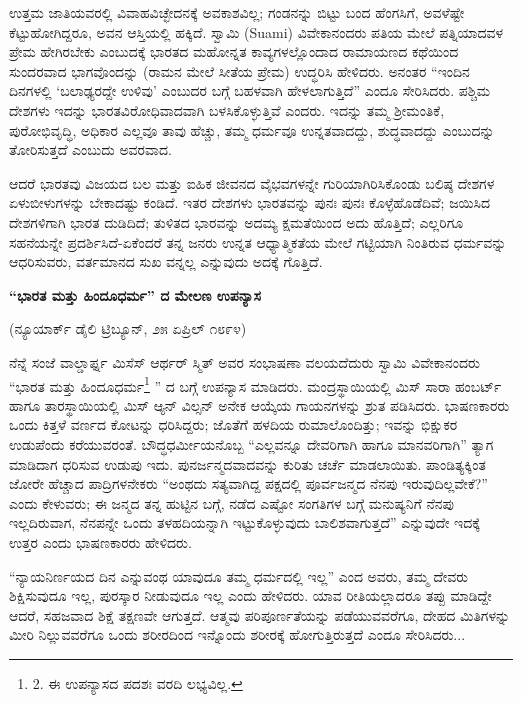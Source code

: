 ಉತ್ತಮ ಜಾತಿಯವರಲ್ಲಿ ವಿವಾಹವಿಚ್ಛೇದನಕ್ಕೆ ಅವಕಾಶವಿಲ್ಲ; ಗಂಡನನ್ನು ಬಿಟ್ಟು ಬಂದ ಹೆಂಗಸಿಗೆ, ಅವಳೆಷ್ಟೇ ಕೆಟ್ಟುಹೋಗಿದ್ದರೂ, ಅವನ ಆಸ್ತಿಯಲ್ಲಿ ಹಕ್ಕಿದೆ. ಸ್ವಾಮಿ (Suami) ವಿವೇಕಾನಂದರು ಪತಿಯ ಮೇಲೆ ಪತ್ನಿಯಾದವಳ ಪ್ರೇಮ ಹೇಗಿರಬೇಕು ಎಂಬುದಕ್ಕೆ ಭಾರತದ ಮಹೋನ್ನತ ಕಾವ್ಯಗಳಲ್ಲೊಂದಾದ ರಾಮಾಯಣದ ಕಥೆಯಿಂದ ಸುಂದರವಾದ ಭಾಗವೊಂದನ್ನು (ರಾಮನ ಮೇಲೆ ಸೀತೆಯ ಪ್ರೇಮ) ಉದ್ಧರಿಸಿ ಹೇಳಿದರು. ಅನಂತರ “ಇಂದಿನ ದಿನಗಳಲ್ಲಿ ‘ಬಲಾಢ್ಯರದ್ದೇ ಉಳಿವು’ ಎಂಬುದರ ಬಗ್ಗೆ ಬಹಳವಾಗಿ ಹೇಳಲಾಗುತ್ತಿದೆ” ಎಂದೂ ಸೇರಿಸಿದರು. ಪಶ್ಚಿಮ ದೇಶಗಳು ಇದನ್ನು ಭಾರತವಿರೋಧಿವಾದವಾಗಿ ಬಳಸಿಕೊಳ್ಳುತ್ತಿವೆ ಎಂದರು. ಇದನ್ನು ತಮ್ಮ ಶ‍್ರೀಮಂತಿಕೆ, ಪುರೋಭಿವೃದ್ಧಿ, ಅಧಿಕಾರ ಎಲ್ಲವೂ ತಾವು ಹೆಚ್ಚು, ತಮ್ಮ ಧರ್ಮವೂ ಉನ್ನತವಾದದ್ದು, ಶುದ್ಧವಾದದ್ದು ಎಂಬುದನ್ನು ತೋರಿಸುತ್ತದೆ ಎಂಬುದು ಅವರವಾದ.

ಆದರೆ ಭಾರತವು ವಿಜಯದ ಬಲ ಮತ್ತು ಐಹಿಕ ಜೀವನದ ವೈಭವಗಳನ್ನೇ ಗುರಿಯಾಗಿರಿಸಿಕೊಂಡು ಬಲಿಷ್ಠ ದೇಶಗಳ ಏಳುಬೀಳುಗಳನ್ನು ಬೇಕಾದಷ್ಟು ಕಂಡಿದೆ. ಇತರ ದೇಶಗಳು ಭಾರತವನ್ನು ಪುನಃ ಪುನಃ ಕೊಳ್ಳೆಹೊಡೆದಿವೆ; ಜಯಿಸಿದ ದೇಶಗಳಿಗಾಗಿ ಭಾರತ ದುಡಿದಿದೆ; ತುಳಿತದ ಭಾರವನ್ನು ಅದಮ್ಯ ಕ್ಷಮತೆಯಿಂದ ಅದು ಹೊತ್ತಿದೆ; ಎಲ್ಲರಿಗೂ ಸಹನೆಯನ್ನೇ ಪ್ರದರ್ಶಿಸಿದೆ-ಏಕೆಂದರೆ ತನ್ನ ಜನರು ಉನ್ನತ ಆಧ್ಯಾತ್ಮಿಕತೆಯ ಮೇಲೆ ಗಟ್ಟಿಯಾಗಿ ನಿಂತಿರುವ ಧರ್ಮವನ್ನು ಆಧರಿಸುವರು, ವರ್ತಮಾನದ ಸುಖ ವನ್ನಲ್ಲ ಎನ್ನುವುದು ಅದಕ್ಕೆ ಗೊತ್ತಿದೆ.

\begin{center}
\textbf{“ಭಾರತ ಮತ್ತು ಹಿಂದೂಧರ್ಮ” ದ ಮೇಲಣ ಉಪನ್ಯಾಸ}
\end{center}

\begin{center}
(ನ್ಯೂಯಾರ್ಕ್ ಡೈಲಿ ಟ್ರಿಬ್ಯೂನ್, ೨೫ ಏಪ್ರಿಲ್ ೧೮೯೪)
\end{center}

ನೆನ್ನೆ ಸಂಜೆ ವಾಲ್ಡಾರ್ಫ್ನ ಮಿಸೆಸ್ ಆರ್ಥರ್ ಸ್ಮಿತ್ ಅವರ ಸಂಭಾಷಣಾ ವಲಯದೆದುರು ಸ್ವಾಮಿ ವಿವೇಕಾನಂದರು “ಭಾರತ ಮತ್ತು ಹಿಂದೂಧರ್ಮ\footnote{2. ಈ ಉಪನ್ಯಾಸದ ಪದಶಃ ವರದಿ ಲಭ್ಯವಿಲ್ಲ.} ” ದ ಬಗ್ಗೆ ಉಪನ್ಯಾಸ ಮಾಡಿದರು. ಮಂದ್ರಸ್ಥಾಯಿಯಲ್ಲಿ ಮಿಸ್ ಸಾರಾ ಹಂಬರ್ಟ್ ಹಾಗೂ ತಾರಸ್ಥಾಯಿಯಲ್ಲಿ ಮಿಸ್ ಆ್ಯನ್ ವಿಲ್ಸನ್ ಅನೇಕ ಆಯ್ಕೆಯ ಗಾಯನಗಳನ್ನು ಶ್ರುತ ಪಡಿಸಿದರು. ಭಾಷಣಕಾರರು ಒಂದು ಕಿತ್ತಳೆ ವರ್ಣದ ಕೋಟನ್ನು ಧರಿಸಿದ್ದರು; ಜೊತೆಗೆ ಹಳದಿಯ ರುಮಾಲೊಂದಿತ್ತು; ಇವನ್ನು ಭಿಕ್ಷುಕರ ಉಡುಪೆಂದು ಕರೆಯುವರಂತೆ. ಬೌದ್ಧಧರ್ಮೀಯನೊಬ್ಬ “ಎಲ್ಲವನ್ನೂ ದೇವರಿಗಾಗಿ ಹಾಗೂ ಮಾನವರಿಗಾಗಿ” ತ್ಯಾಗ ಮಾಡಿದಾಗ ಧರಿಸುವ ಉಡುಪು ಇದು. ಪುನರ್ಜನ್ಮದವಾದವನ್ನು ಕುರಿತು ಚರ್ಚೆ ಮಾಡಲಾಯಿತು. ಪಾಂಡಿತ್ಯಕ್ಕಿಂತ ಜೋರೇ ಹೆಚ್ಚಾದ ಪಾದ್ರಿಗಳನೇಕರು “ಅಂಥದು ಸತ್ಯವಾಗಿದ್ದ ಪಕ್ಷದಲ್ಲಿ ಪೂರ್ವಜನ್ಮದ ನೆನಪು ಇರುವುದಿಲ್ಲವೇಕೆ?” ಎಂದು ಕೇಳುವರು; ಈ ಜನ್ಮದ ತನ್ನ ಹುಟ್ಟಿನ ಬಗ್ಗೆ, ನಡೆದ ಎಷ್ಟೋ ಸಂಗತಿಗಳ ಬಗ್ಗೆ ಮನುಷ್ಯನಿಗೆ ನೆನಪು ಇಲ್ಲದಿರುವಾಗ, ನೆನಪನ್ನೇ ಒಂದು ತಳಹದಿಯನ್ನಾಗಿ ಇಟ್ಟುಕೊಳ್ಳುವುದು ಬಾಲಿಶವಾಗುತ್ತದೆ” ಎನ್ನುವುದೇ ಇದಕ್ಕೆ ಉತ್ತರ ಎಂದು ಭಾಷಣಕಾರರು ಹೇಳಿದರು.

“ನ್ಯಾಯನಿರ್ಣಯದ ದಿನ ಎನ್ನುವಂಥ ಯಾವುದೂ ತಮ್ಮ ಧರ್ಮದಲ್ಲಿ ಇಲ್ಲ” ಎಂದ ಅವರು, ತಮ್ಮ ದೇವರು ಶಿಕ್ಷಿಸುವುದೂ ಇಲ್ಲ, ಪುರಸ್ಕಾರ ನೀಡುವುದೂ ಇಲ್ಲ ಎಂದು ಹೇಳಿದರು. ಯಾವ ರೀತಿಯಲ್ಲಾದರೂ ತಪ್ಪು ಮಾಡಿದ್ದೇ ಆದರೆ, ಸಹಜವಾದ ಶಿಕ್ಷೆ ತಕ್ಷಣವೇ ಆಗುತ್ತದೆ. ಆತ್ಮವು ಪರಿಪೂರ್ಣತೆಯನ್ನು ಪಡೆಯುವವರೆಗೂ, ದೇಹದ ಮಿತಿಗಳನ್ನು ಮೀರಿ ನಿಲ್ಲುವವರೆಗೂ ಒಂದು ಶರೀರದಿಂದ ಇನ್ನೊಂದು ಶರೀರಕ್ಕೆ ಹೋಗುತ್ತಿರುತ್ತದೆ ಎಂದೂ ಸೇರಿಸಿದರು...

